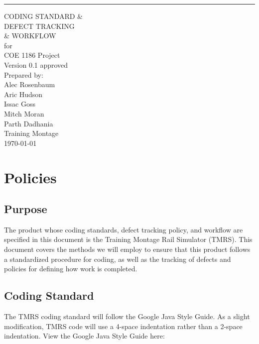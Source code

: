 \documentclass{scrreprt}
\date{}
\def\myversion{0.1 }
\begin{document}
\begin{flushright}
    \rule{16cm}{5pt}\vskip1cm
    \begin{bfseries}
        \Huge{CODING STANDARD &\\ 
        DEFECT TRACKING\\ 
        \& WORKFLOW}\\
        \vspace{.9cm}
        for\\
        \vspace{.9cm}
        COE 1186 Project\\
        \vspace{.9cm}
        \LARGE{Version \myversion approved}\\
        \vspace{.9cm}
        Prepared by:\\
        Alec Rosenbaum\\
        Aric Hudson\\
        Issac Goss\\
        Mitch Moran\\
        Parth Dadhania\\
        \vspace{1.9cm}
        Training Montage\\
        \vspace{.9cm}
        \today\\
    \end{bfseries}
\end{flushright}

\tableofcontents

\chapter{Policies}

\section{Purpose}
The product whose coding standards, defect tracking policy, and workflow are specified in this document is the Training Montage Rail Simulator (TMRS). This document covers the methods we will employ to ensure that this product follows a standardized procedure for coding, as well as the tracking of defects and policies for defining how work is completed.

\section{Coding Standard}
The TMRS coding standard will follow the Google Java Style Guide. As a slight modification, TMRS code will use a 4-space indentation rather than a 2-space indentation. View the Google Java Style Guide here:
\end{document}
